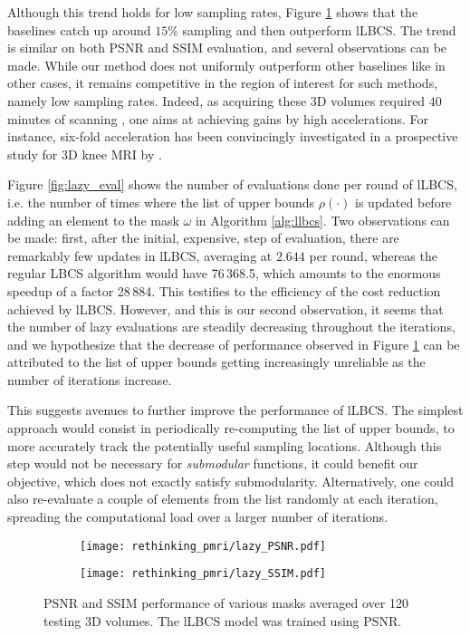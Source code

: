    Although this trend holds for low sampling rates, Figure \ref{fig:3D_performance} shows that the baselines catch up around $15\%$ sampling and then outperform lLBCS. The trend is similar on both PSNR and SSIM evaluation, and several observations can be made. While our method does not uniformly outperform other baselines like in other cases, it remains competitive in the region of interest for such methods, namely low sampling rates. Indeed, as acquiring these 3D volumes required 40 minutes of scanning \citep{sawyer2013creation}, one aims at achieving gains by high accelerations. For instance, six-fold acceleration has been convincingly investigated in a prospective study for 3D knee MRI by \citet{fritz2016six}.

    Figure \ref{fig:lazy_eval} shows the number of evaluations done per round of lLBCS, i.e. the number of times where the list of upper bounds $\rho(\cdot)$ is updated before adding an element to the mask $\omega$ in Algorithm \ref{alg:llbcs}. Two observations can be made: first, after the initial, expensive, step of evaluation, there are remarkably few updates in lLBCS, averaging at $2.644$ per round, whereas the regular LBCS algorithm would have 76\,368.5, which amounts to the enormous speedup of a factor 28\,884. This testifies to the efficiency of the cost reduction achieved by lLBCS. However, and this is our second observation, it seems that the number of lazy evaluations are steadily decreasing throughout the iterations, and we hypothesize that the decrease of performance observed in Figure \ref{fig:3D_performance} can be attributed to the list of upper bounds getting increasingly unreliable as the number of iterations increase.

    This suggests avenues to further improve the performance of lLBCS. The simplest approach would consist in periodically re-computing the list of upper bounds, to more accurately track the potentially useful sampling locations. Although this step would not be necessary for \textit{submodular} functions, it could benefit our objective, which does not exactly satisfy submodularity. Alternatively, one could also re-evaluate a couple of elements from the list randomly at each iteration, spreading the computational load over a larger number of iterations.

    \begin{figure}[!t]
        \centering
        \begin{subfigure}{0.48\linewidth}
            \centering
            \texttt{[image: rethinking\_pmri/lazy\_PSNR.pdf]}
        \end{subfigure}
        \hfill
        \begin{subfigure}{0.48\linewidth}
            \centering
            \texttt{[image: rethinking\_pmri/lazy\_SSIM.pdf]}
        \end{subfigure}
        \caption{PSNR and SSIM performance of various masks averaged over 120 testing 3D volumes. The lLBCS model was trained using PSNR.}\label{fig:3D_performance}
    \end{figure}

